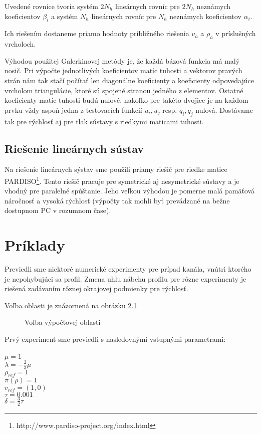 Uvedené rovnice tvoria systém $2N_h$ lineárnych rovníc pre $2N_h$ neznámych
koeficientov $\beta_i$ a systém $N_h$ lineárnych rovníc pre $N_h$ neznámych
koeficientov $\alpha_i$. 

Ich riešením dostaneme priamo hodnoty približného riešenia $v_h$ a $\rho_h$ v
príslušných vrcholoch.
  
Výhodou použitej Galerkinovej metódy je, že každá bázová funkcia má malý nosič.
Pri výpočte jednotlivých koeficientov matíc tuhosti a vektorov pravých strán 
nám tak stačí počítať len diagonálne koeficienty a koeficienty odpovedajúce
vrcholom triangulácie, ktoré sú spojené stranou jedného z elementov. Ostatné
koeficienty matíc tuhosti budú nulové, nakoľko pre takéto dvojice je na každom
prvku vždy aspoň jedna z testovacích funkcií $u_i, u_j$ resp. $q_i,q_j$ nulová.   
Dostávame tak pre rýchlosť aj pre tlak sústavy s riedkymi maticami tuhosti. 

\section{Riešenie lineárnych sústav}

Na riešenie lineárnych sýstav 
sme použili priamy riešič pre riedke matice
PARDISO\footnote{http://www.pardiso-project.org/index.html}. Tento riešič pracuje pre
symetrické aj nesymetrické sústavy a je vhodný pre paralelné
spúštanie. Jeho veľkou výhodou je pomerne malá pamäťová náročnosť a vysoká
rýchlosť (výpočty tak mohli byť prevádzané na bežne dostupnom PC v rozumnom čase).

\chapter{Príklady}

Previedli sme niektoré numerické experimenty pre prípad kanála, vnútri ktorého
je nepohybujúci sa profil. Zmena uhlu nábehu profilu pre rôzne experimenty 
je riešená zadávaním rôznej okrajovej podmienky pre rýchlosť.  

Voľba oblasti je znázornená na obrázku \ref{si-im-oblast}
\begin{figure}[h]
  \begin{center}
    \caption{Voľba výpočtovej oblasti}
    \label{si-im-oblast}
  \end{center}
\end{figure}

Prvý experiment sme previedli s nasledovnými vstupnými parametrami:\\\\
$\mu = 1$ \\
$\lambda = -\frac{2}{3}\mu$ \\
$\rho_{ref} = 1$ \\
$\pi(\rho) = 1$ \\
$v_{ref} = (1,0)$ \\
$\tau = 0.001$ \\
$\delta = \frac{3}{2}\tau$ \\

